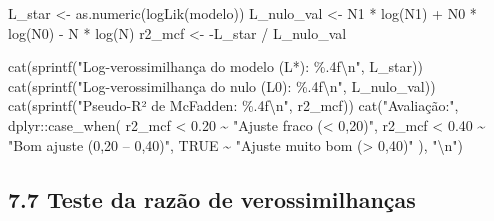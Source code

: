 \documentclass[
  letterpaper,
  DIV=11,
  numbers=noendperiod]{scrartcl}
\newenvironment{Shaded}{\begin{snugshade}}{\end{snugshade}}
\newcommand{\ConstantTok}[1]{\textcolor[rgb]{0.56,0.35,0.01}{#1}}
\newcommand{\FloatTok}[1]{\textcolor[rgb]{0.68,0.00,0.00}{#1}}
\newcommand{\FunctionTok}[1]{\textcolor[rgb]{0.28,0.35,0.67}{#1}}
\newcommand{\NormalTok}[1]{\textcolor[rgb]{0.00,0.23,0.31}{#1}}
\newcommand{\OtherTok}[1]{\textcolor[rgb]{0.00,0.23,0.31}{#1}}
\newcommand{\SpecialCharTok}[1]{\textcolor[rgb]{0.37,0.37,0.37}{#1}}
\newcommand{\StringTok}[1]{\textcolor[rgb]{0.13,0.47,0.30}{#1}}
\begin{document}
\begin{Shaded}
\begin{Highlighting}[]
\NormalTok{L\_star    }\OtherTok{\textless{}{-}} \FunctionTok{as.numeric}\NormalTok{(}\FunctionTok{logLik}\NormalTok{(modelo))}
\NormalTok{L\_nulo\_val }\OtherTok{\textless{}{-}}\NormalTok{ N1 }\SpecialCharTok{*} \FunctionTok{log}\NormalTok{(N1) }\SpecialCharTok{+}\NormalTok{ N0 }\SpecialCharTok{*} \FunctionTok{log}\NormalTok{(N0) }\SpecialCharTok{{-}}\NormalTok{ N }\SpecialCharTok{*} \FunctionTok{log}\NormalTok{(N)}
\NormalTok{r2\_mcf    }\OtherTok{\textless{}{-}} \SpecialCharTok{{-}}\NormalTok{L\_star }\SpecialCharTok{/}\NormalTok{ L\_nulo\_val}

\FunctionTok{cat}\NormalTok{(}\FunctionTok{sprintf}\NormalTok{(}\StringTok{"Log{-}verossimilhança do modelo (L*): \%.4f}\SpecialCharTok{\textbackslash{}n}\StringTok{"}\NormalTok{, L\_star))}
\FunctionTok{cat}\NormalTok{(}\FunctionTok{sprintf}\NormalTok{(}\StringTok{"Log{-}verossimilhança do nulo  (L0): \%.4f}\SpecialCharTok{\textbackslash{}n}\StringTok{"}\NormalTok{, L\_nulo\_val))}
\FunctionTok{cat}\NormalTok{(}\FunctionTok{sprintf}\NormalTok{(}\StringTok{"Pseudo{-}R² de McFadden:              \%.4f}\SpecialCharTok{\textbackslash{}n}\StringTok{"}\NormalTok{, r2\_mcf))}
\FunctionTok{cat}\NormalTok{(}\StringTok{"Avaliação:"}\NormalTok{,}
\NormalTok{    dplyr}\SpecialCharTok{::}\FunctionTok{case\_when}\NormalTok{(}
\NormalTok{      r2\_mcf }\SpecialCharTok{\textless{}} \FloatTok{0.20} \SpecialCharTok{\textasciitilde{}} \StringTok{"Ajuste fraco (\textless{} 0,20)"}\NormalTok{,}
\NormalTok{      r2\_mcf }\SpecialCharTok{\textless{}} \FloatTok{0.40} \SpecialCharTok{\textasciitilde{}} \StringTok{"Bom ajuste (0,20 – 0,40)"}\NormalTok{,}
      \ConstantTok{TRUE}          \SpecialCharTok{\textasciitilde{}} \StringTok{"Ajuste muito bom (\textgreater{} 0,40)"}
\NormalTok{    ), }\StringTok{"}\SpecialCharTok{\textbackslash{}n}\StringTok{"}\NormalTok{)}
\end{Highlighting}
\end{Shaded}

\subsection{7.7 Teste da razão de
verossimilhanças}\label{teste-da-razuxe3o-de-verossimilhanuxe7as}
\end{document}
